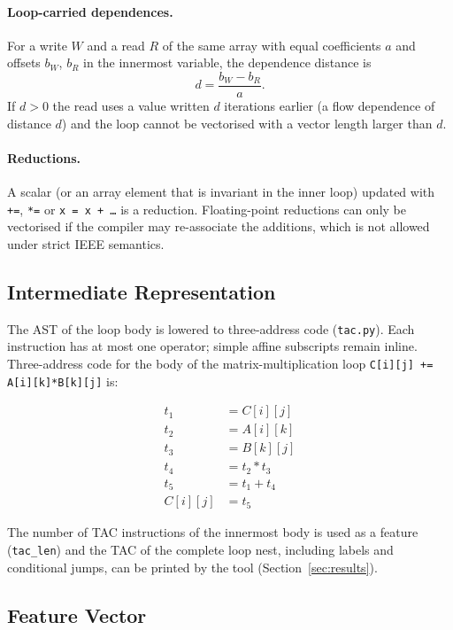 \documentclass[12pt,a4paper]{article}
\begin{document}
\paragraph{Loop-carried dependences.} For a write $W$ and a read $R$ of the same
array with equal coefficients $a$ and offsets $b_W$, $b_R$ in the innermost
variable, the dependence distance is
\begin{equation}
d = \frac{b_W - b_R}{a}.
\end{equation}
If $d>0$ the read uses a value written $d$ iterations earlier (a flow dependence of
distance $d$) and the loop cannot be vectorised with a vector length larger than $d$.

\paragraph{Reductions.} A scalar (or an array element that is invariant in the inner loop)
updated with \texttt{+=}, \texttt{*=} or \texttt{x = x + \dots} is a reduction. Floating-point
reductions can only be vectorised if the compiler may re-associate the additions,
which is not allowed under strict IEEE semantics.

\subsection{Intermediate Representation}

The AST of the loop body is lowered to three-address code (\texttt{tac.py}). Each
instruction has at most one operator; simple affine subscripts remain inline.
Three-address code for the body of the matrix-multiplication loop
\texttt{C[i][j] += A[i][k]*B[k][j]} is:

\begin{align}
t_1 &= C[i][j]\\
t_2 &= A[i][k]\\
t_3 &= B[k][j]\\
t_4 &= t_2 * t_3\\
t_5 &= t_1 + t_4\\
C[i][j] &= t_5
\end{align}

The number of TAC instructions of the innermost body is used as a feature
(\texttt{tac\_len}) and the TAC of the complete loop nest, including labels and
conditional jumps, can be printed by the tool (Section~\ref{sec:results}).

\subsection{Feature Vector}
\end{document}
